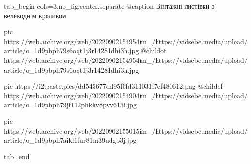  
 
 
 
 


\ifcmt
  tab_begin cols=3,no_fig,center,separate
		 @caption Вінтажні листівки з великоднім кроликом

     pic https://web.archive.org/web/20220902154954im_/https://vidsebe.media/upload/article/o_1d9pbph79s6oqt1j3r14281dhi3h.jpg
		 @childof https://web.archive.org/web/20220902154954im_/https://vidsebe.media/upload/article/o_1d9pbph79s6oqt1j3r14281dhi3h.jpg

		 pic https://i2.paste.pics/dd545677dd95f6fd311031f7ef480612.png
		 @childof https://web.archive.org/web/20220902154904im_/https://vidsebe.media/upload/article/o_1d9pbph79jf112phkhv8pvv613i.jpg

		 pic https://web.archive.org/web/20220902155015im_/https://vidsebe.media/upload/article/o_1d9pbph7aikl1fur81m39udgb3j.jpg

  tab_end
\fi

